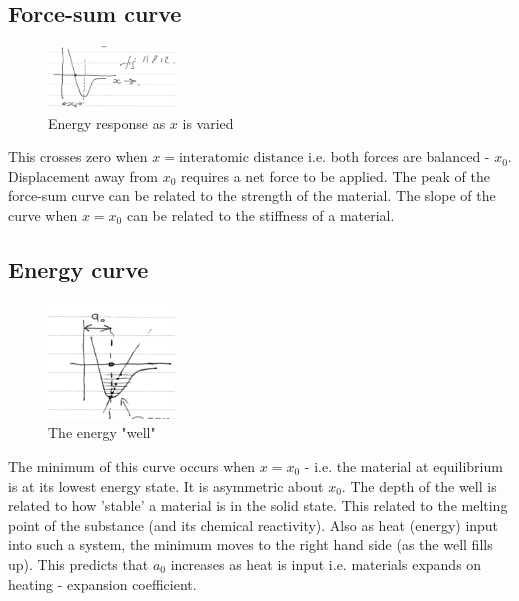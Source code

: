 \documentclass[class=report, crop=false, 12pt,a4paper]{standalone}
\begin{document}
\subsection{Force-sum curve}
\begin{figure}[h!]
  \centering
  \includegraphics[width = 0.3\textwidth]{../img/energyresponse}
  \caption{Energy response as $x$ is varied}
  \label{fig:energyresponse}
\end{figure}
This crosses zero when $x = \textrm{interatomic distance}$ i.e. both forces are balanced - $x_0$. Displacement away from $x_0$ requires a net force to be applied. The peak of the force-sum curve can be related to the strength of the material. The slope of the curve when $x=x_0$ can be related to the stiffness of a material.
\subsection{Energy curve}
\begin{figure}[h!]
  \centering
  \includegraphics[width = 0.3\textwidth]{../img/energywell}
  \caption{The energy "well"}
  \label{fig:energycurve}
\end{figure}
The minimum of this curve occurs when $x=x_0$ - i.e. the material at equilibrium is at its lowest energy state. It is asymmetric about $x_0$. The depth of the well is related to how 'stable' a material is in the solid state. This related to the melting point of the substance (and its chemical reactivity). Also as heat (energy) input into such a system, the minimum moves to the right hand side (as the well fills up). This predicts that $a_0$ increases as heat is input i.e. materials expands on heating - expansion coefficient.
\end{document}
